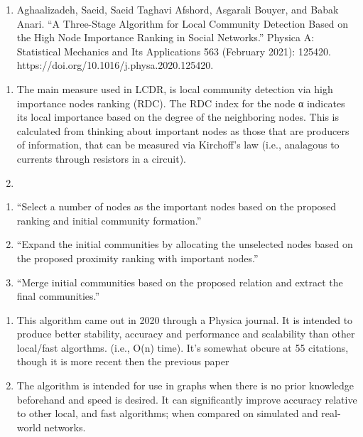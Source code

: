 \documentclass[11pt]{article}
\providecommand{\tightlist}{%
      \setlength{\itemsep}{0pt}\setlength{\parskip}{0pt}}
\begin{document}
\begin{enumerate}
\def\labelenumi{\arabic{enumi}.}
\setcounter{enumi}{1}
\tightlist
\item
  Aghaalizadeh, Saeid, Saeid Taghavi Afshord, Asgarali Bouyer, and Babak
  Anari. ``A Three-Stage Algorithm for Local Community Detection Based
  on the High Node Importance Ranking in Social Networks.'' Physica A:
  Statistical Mechanics and Its Applications 563 (February 2021):
  125420. https://doi.org/10.1016/j.physa.2020.125420.
\end{enumerate}

\begin{enumerate}
\def\labelenumi{(\alph{enumi})}
\tightlist
\item
  The main measure used in LCDR, is local community detection via high
  importance nodes ranking (RDC). The RDC index for the node α indicates
  its local importance based on the degree of the neighboring nodes.
  This is calculated from thinking about important nodes as those that
  are producers of information, that can be measured via Kirchoff's law
  (i.e., analagous to currents through resistors in a circuit).
\item
\end{enumerate}

\begin{enumerate}
\def\labelenumi{\arabic{enumi}.}
\tightlist
\item
  ``Select a number of nodes as the important nodes based on the
  proposed ranking and initial community formation.''
\item
  ``Expand the initial communities by allocating the unselected nodes
  based on the proposed proximity ranking with important nodes.''
\item
  ``Merge initial communities based on the proposed relation and extract
  the final communities.''
\end{enumerate}

\begin{enumerate}
\def\labelenumi{(\alph{enumi})}
\setcounter{enumi}{2}
\tightlist
\item
  This algorithm came out in 2020 through a Physica journal. It is
  intended to produce better stability, accuracy and performance and
  scalability than other local/fast algorthms. (i.e., O(n) time). It's
  somewhat obcure at 55 citations, though it is more recent then the
  previous paper
\item
  The algorithm is intended for use in graphs when there is no prior
  knowledge beforehand and speed is desired. It can significantly
  improve accuracy relative to other local, and fast algorithms; when
  compared on simulated and real-world networks.
\end{enumerate}
\end{document}
